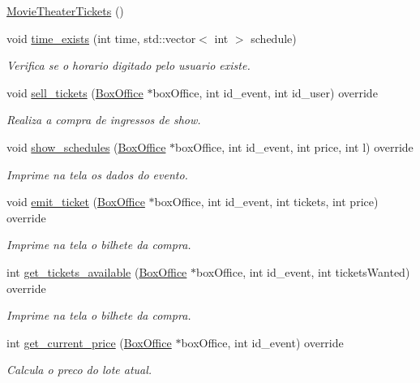 \begin{DoxyCompactItemize}
\item 
\hyperlink{class_movie_theater_tickets_aef090188bf8b001538ee280c1ed889e5}{Movie\+Theater\+Tickets} ()
\item 
void \hyperlink{class_movie_theater_tickets_a5a68fb8fa3f990ea7087b620595bda04}{time\+\_\+exists} (int time, std\+::vector$<$ int $>$ schedule)
\begin{DoxyCompactList}\small\item\em Verifica se o horario digitado pelo usuario existe. \end{DoxyCompactList}\item 
void \hyperlink{class_movie_theater_tickets_a5b82ac266d97c8517955c67e83ac810e}{sell\+\_\+tickets} (\hyperlink{class_box_office}{Box\+Office} $\ast$box\+Office, int id\+\_\+event, int id\+\_\+user) override
\begin{DoxyCompactList}\small\item\em Realiza a compra de ingressos de show. \end{DoxyCompactList}\item 
void \hyperlink{class_movie_theater_tickets_a488ff6563e0970877213098cee719c50}{show\+\_\+schedules} (\hyperlink{class_box_office}{Box\+Office} $\ast$box\+Office, int id\+\_\+event, int price, int l) override
\begin{DoxyCompactList}\small\item\em Imprime na tela os dados do evento. \end{DoxyCompactList}\item 
void \hyperlink{class_movie_theater_tickets_a17e3580fee82f4477c4cc3f27283af5a}{emit\+\_\+ticket} (\hyperlink{class_box_office}{Box\+Office} $\ast$box\+Office, int id\+\_\+event, int tickets, int price) override
\begin{DoxyCompactList}\small\item\em Imprime na tela o bilhete da compra. \end{DoxyCompactList}\item 
int \hyperlink{class_movie_theater_tickets_ae823c90ab6c3d25a2168972e6e16953f}{get\+\_\+tickets\+\_\+available} (\hyperlink{class_box_office}{Box\+Office} $\ast$box\+Office, int id\+\_\+event, int tickets\+Wanted) override
\begin{DoxyCompactList}\small\item\em Imprime na tela o bilhete da compra. \end{DoxyCompactList}\item 
int \hyperlink{class_movie_theater_tickets_a51e0ad53bf50085a53625a97bf4ebd6a}{get\+\_\+current\+\_\+price} (\hyperlink{class_box_office}{Box\+Office} $\ast$box\+Office, int id\+\_\+event) override
\begin{DoxyCompactList}\small\item\em Calcula o preco do lote atual. \end{DoxyCompactList}\end{DoxyCompactItemize}
